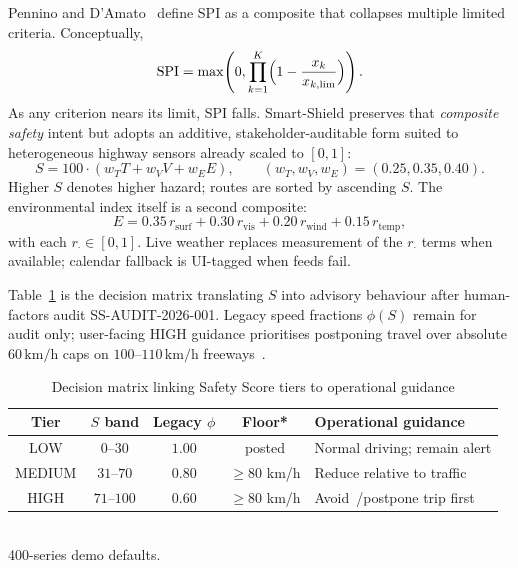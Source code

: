 \documentclass[11pt,a4paper]{article}
\begin{document}
Pennino and D'Amato~\citep{pennino2024weather} define SPI as a composite that collapses multiple limited criteria. Conceptually,
\begin{equation}
\mathrm{SPI}=\max\!\left(0,\prod_{k=1}^{K}\Bigl(1-\frac{x_k}{x_{k,\mathrm{lim}}}\Bigr)\right).
\label{eq:spi}
\end{equation}
As any criterion nears its limit, SPI falls. Smart-Shield preserves that \emph{composite safety} intent but adopts an additive, stakeholder-auditable form suited to heterogeneous highway sensors already scaled to $[0,1]$:
\begin{equation}
\boxed{S=100\cdot(w_T T+w_V V+w_E E),\qquad (w_T,w_V,w_E)=(0.25,0.35,0.40).}
\label{eq:S}
\end{equation}
Higher $S$ denotes higher hazard; routes are sorted by ascending $S$. The environmental index itself is a second composite:
\begin{equation}
E=0.35\,r_{\mathrm{surf}}+0.30\,r_{\mathrm{vis}}+0.20\,r_{\mathrm{wind}}+0.15\,r_{\mathrm{temp}},
\label{eq:E}
\end{equation}
with each $r_{\cdot}\in[0,1]$. Live weather replaces measurement of the $r_{\cdot}$ terms when available; calendar fallback is UI-tagged when feeds fail.

Table~\ref{tab:decision} is the decision matrix translating $S$ into advisory behaviour after human-factors audit SS-AUDIT-2026-001. Legacy speed fractions $\phi(S)$ remain for audit only; user-facing HIGH guidance prioritises postponing travel over absolute $60\,\mathrm{km/h}$ caps on $100$--$110\,\mathrm{km/h}$ freeways~\citep{ahmad2022speed}.

\begin{table}[htbp]
\centering
\caption{Decision matrix linking Safety Score tiers to operational guidance}
\label{tab:decision}
\small
\begin{tabular}{@{}ccccp{4.8cm}@{}}
\toprule
\textbf{Tier} & $S$ band & Legacy $\phi$ & Floor* & Operational guidance \\
\midrule
LOW & $0$--$30$ & $1.00$ & posted & Normal driving; remain alert \\
MEDIUM & $31$--$70$ & $0.80$ & $\ge80$ km/h & Reduce relative to traffic \\
HIGH & $71$--$100$ & $0.60$ & $\ge80$ km/h & Avoid~/postpone trip first \\
\bottomrule
\end{tabular}\\[2pt]
{\footnotesize *400-series demo defaults.}
\end{table}
\end{document}
